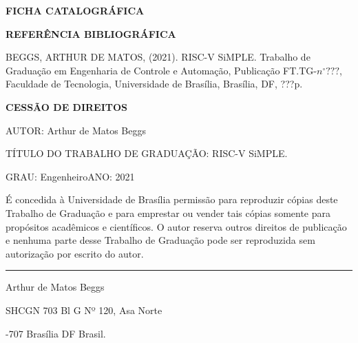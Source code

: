\noindent \textbf{FICHA CATALOGRÁFICA}

\noindent %

\noindent \medskip{}


\noindent \textbf{REFERÊNCIA BIBLIOGRÁFICA}

BEGGS, ARTHUR DE MATOS, (2021). RISC-V SiMPLE. Trabalho de Graduação
em Engenharia de Controle e Automação, Publicação FT.TG-$n^{\circ}???$,
Faculdade de Tecnologia, Universidade de Brasília, Brasília, DF, ???p.

\noindent \bigskip{}


\noindent \textbf{CESSÃO DE DIREITOS}

\noindent AUTOR: Arthur de Matos Beggs

TÍTULO DO TRABALHO DE GRADUAÇÃO: RISC-V SiMPLE.

\noindent \medskip{}


\noindent GRAU: Engenheiro\hfill{}ANO: 2021\hfill{}

\noindent \medskip{}


É concedida à Universidade de Brasília permissão para reproduzir cópias
deste Trabalho de Graduação e para emprestar ou vender tais cópias
somente para propósitos acadêmicos e científicos. O autor reserva
outros direitos de publicação e nenhuma parte desse Trabalho de Graduação
pode ser reproduzida sem autorização por escrito do autor.

\noindent \bigskip{}


\noindent \rule[0.5ex]{1\columnwidth}{1pt}

\noindent Arthur de Matos Beggs

\noindent SHCGN 703 Bl G Nº 120, Asa Norte

-707 Brasília \textendash{} DF \textendash{} Brasil.
